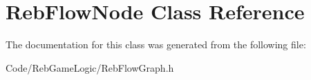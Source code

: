 \hypertarget{class_reb_flow_node}{}\section{Reb\+Flow\+Node Class Reference}
\label{class_reb_flow_node}


The documentation for this class was generated from the following file\+:\begin{DoxyCompactItemize}
\item 
Code/\+Reb\+Game\+Logic/Reb\+Flow\+Graph.\+h\end{DoxyCompactItemize}
